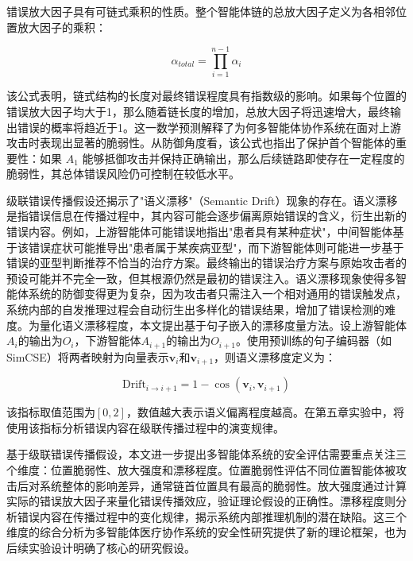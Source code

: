 错误放大因子具有可链式乘积的性质。整个智能体链的总放大因子定义为各相邻位置放大因子的乘积：

\begin{equation}
\alpha_{total} = \prod_{i=1}^{n-1} \alpha_i
\label{eq:total_amplification}
\end{equation}

该公式表明，链式结构的长度对最终错误程度具有指数级的影响。如果每个位置的错误放大因子均大于1，那么随着链长度的增加，总放大因子将迅速增大，最终输出错误的概率将趋近于1。这一数学预测解释了为何多智能体协作系统在面对上游攻击时表现出显著的脆弱性。从防御角度看，该公式也指出了保护首个智能体的重要性：如果 $A_1$ 能够抵御攻击并保持正确输出，那么后续链路即使存在一定程度的脆弱性，其总体错误风险仍可控制在较低水平。

级联错误传播假设还揭示了"语义漂移"（Semantic Drift）现象的存在。语义漂移是指错误信息在传播过程中，其内容可能会逐步偏离原始错误的含义，衍生出新的错误内容。例如，上游智能体可能错误地指出"患者具有某种症状"，中间智能体基于该错误症状可能推导出"患者属于某疾病亚型"，而下游智能体则可能进一步基于错误的亚型判断推荐不恰当的治疗方案。最终输出的错误治疗方案与原始攻击者的预设可能并不完全一致，但其根源仍然是最初的错误注入。语义漂移现象使得多智能体系统的防御变得更为复杂，因为攻击者只需注入一个相对通用的错误触发点，系统内部的自发推理过程会自动衍生出多样化的错误结果，增加了错误检测的难度。为量化语义漂移程度，本文提出基于句子嵌入的漂移度量方法。设上游智能体$A_i$的输出为$O_i$，下游智能体$A_{i+1}$的输出为$O_{i+1}$。使用预训练的句子编码器（如SimCSE\cite{gao2021simcse}）将两者映射为向量表示$\mathbf{v}_i$和$\mathbf{v}_{i+1}$，则语义漂移度定义为：

\begin{equation}
\text{Drift}_{i \to i+1} = 1 - \cos(\mathbf{v}_i, \mathbf{v}_{i+1})
\label{eq:semantic_drift}
\end{equation}

该指标取值范围为$[0, 2]$，数值越大表示语义偏离程度越高。在第五章实验中，将使用该指标分析错误内容在级联传播过程中的演变规律。

基于级联错误传播假设，本文进一步提出多智能体系统的安全评估需要重点关注三个维度：位置脆弱性、放大强度和漂移程度。位置脆弱性评估不同位置智能体被攻击后对系统整体的影响差异，通常链首位置具有最高的脆弱性。放大强度通过计算实际的错误放大因子来量化错误传播效应，验证理论假设的正确性。漂移程度则分析错误内容在传播过程中的变化规律，揭示系统内部推理机制的潜在缺陷。这三个维度的综合分析为多智能体医疗协作系统的安全性研究提供了新的理论框架，也为后续实验设计明确了核心的研究假设。

